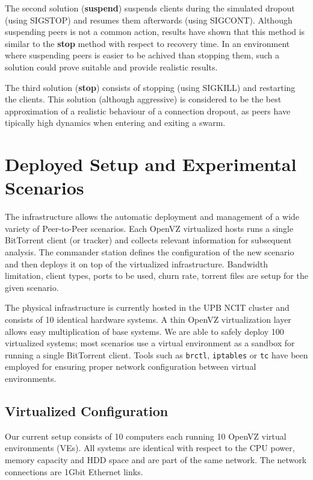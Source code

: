 The second solution (\textbf{suspend}) suspends clients during the simulated
dropout (using SIGSTOP) and resumes them afterwards (using SIGCONT). Although
suspending peers is not a common action, results have shown that this method
is similar to the \textbf{stop} method with respect to recovery time. In an
environment where suspending peers is easier to be achived than stopping them,
such a solution could prove suitable and provide realistic results.

The third solution (\textbf{stop}) consists of stopping (using SIGKILL) and
restarting the clients. This solution (although aggressive) is considered to
be the best approximation of a realistic behaviour of a connection dropout, as
peers have tipically high dynamics when entering and exiting a swarm.

\section{Deployed Setup and Experimental Scenarios}
\label{sec:virt-infra:setup-scenarios}

The infrastructure allows the automatic deployment and management of a wide
variety of Peer-to-Peer scenarios. Each OpenVZ virtualized hosts runs a single
BitTorrent client (or tracker) and collects relevant information for
subsequent analysis. The commander station defines the configuration of the
new scenario and then deploys it on top of the virtualized infrastructure.
Bandwidth limitation, client types, ports to be used, churn rate, torrent
files are setup for the given scenario.

The physical infrastructure is currently hosted in the UPB NCIT cluster and
consists of 10 identical hardware systems. A thin OpenVZ virtualization layer
allows easy multiplication of base systems. We are able to safely deploy 100
virtualized systems; most scenarios use a virtual environment as a sandbox for
running a single BitTorrent client. Tools such as \texttt{brctl},
\texttt{iptables} or \texttt{tc} have been employed for ensuring proper
network configuration between virtual environments.

\subsection{Virtualized Configuration}

Our current setup consists of 10 computers each running 10 OpenVZ virtual
environments (VEs). All systems are  identical with respect to the CPU power,
memory capacity and HDD space and are part of the same network. The network
connections are 1Gbit Ethernet links.

